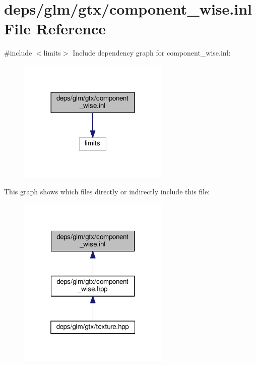 \hypertarget{component__wise_8inl}{}\section{deps/glm/gtx/component\+\_\+wise.inl File Reference}
\label{component__wise_8inl}
{\ttfamily \#include $<$limits$>$}\newline
Include dependency graph for component\+\_\+wise.\+inl\+:
\nopagebreak
\begin{figure}[H]
\begin{center}
\leavevmode
\includegraphics[width=204pt]{d7/d28/component__wise_8inl__incl}
\end{center}
\end{figure}
This graph shows which files directly or indirectly include this file\+:
\nopagebreak
\begin{figure}[H]
\begin{center}
\leavevmode
\includegraphics[width=205pt]{dc/d33/component__wise_8inl__dep__incl}
\end{center}
\end{figure}
